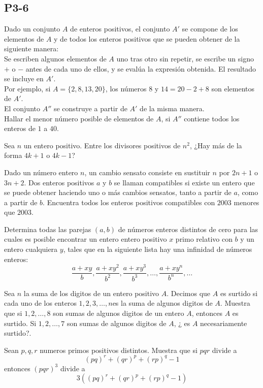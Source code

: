 \documentclass[11pt]{scrartcl}
\begin{document}
\subsection{P3-6}
\begin{problem}
    [2000/3]
    Dado un conjunto $A$ de enteros positivos, el conjunto $A'$ se compone de los elementos de $A$ y de todos los enteros positivos que se pueden obtener de la siguiente manera: \\
Se escriben algunos elementos de $A$ uno tras otro sin repetir, se escribe un signo $+ $ o $-$ antes de cada uno de ellos, y se evalúa la expresión obtenida. El resultado se incluye en $A'$. \\
Por ejemplo, si $A = \{2,8,13,20\}$, los números $8$ y $14 = 20-2+8$ son elementos de $A'$. \\
El conjunto $A''$ se construye a partir de $A'$ de la misma manera. \\
Hallar el menor número posible de elementos de $A$, si $A''$ contiene todos los enteros de $1$ a $40$. 
\end{problem}
\begin{problem}
    [2002/3] 
    Sea $n$ un entero positivo. Entre los divisores positivos de $n^2$, ¿Hay más de la forma $4k+1$ o $4k-1$?
\end{problem}
\begin{problem}
    [2003/6]
    Dado un número entero $n$, un cambio sensato consiste en sustituir $n$ por $2n+1$ o $3n+2$. Dos enteros positivos $a$ y $b$ se llaman compatibles si existe un entero que se puede obtener haciendo uno o más cambios sensatos, tanto a partir de $a$, como a partir de $b$. Encuentra todos los enteros positivos compatibles con $2003$ menores que $2003$.
\end{problem}
\begin{problem}
    [2005/3] 
    Determina todas las parejas $(a,b)$ de números enteros distintos de cero para las cuales es posible encontrar un entero entero positivo $x$ primo relativo con $b$ y un entero cualquiera $y$, tales que en la siguiente lista hay una infinidad de números enteros:
\[\frac{a+xy}{b},\frac{a+xy^2}{b^2},\frac{a+xy^3}{b^3},\dots,\frac{a+xy^n}{b^n},\dots\]
\end{problem}
\begin{problem}
    [2006/6] Sea $n$ la suma de los digitos de un entero positivo $A$. Decimos que $A$ es surtido si cada uno de los enteros $1,2,3, \ldots, n$es la suma de algunos digitos de $A$. Muestra que si $1,2,\ldots, 8$ son sumas de algunos digitos de un entero $A$, entonces $A$ es surtido. Si $1,2,\ldots, 7$ son sumas de algunos digitos de $A$, ¿ es $A$ necesariamente surtido?. 
\end{problem}
\begin{problem}
[2010/6] Sean $p,q,r$ numeros primos positivos distintos. Muestra que si $pqr$ divide a $$(pq)^r+(qr)^p+(rp)^q-1$$ 
entonces $(pqr)^3$ divide a 
$$3((pq)^r+(qr)^p+(rp)^q-1)$$
\end{problem}
\end{document}
